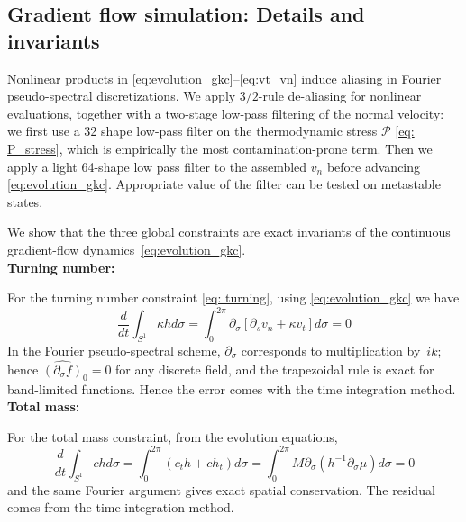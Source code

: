 \documentclass[
aip,
jcp,
reprint, 
floatfix
]{revtex4-1}
\begin{document}
\subsection{Gradient flow simulation: Details and invariants}
Nonlinear products in \eqref{eq:evolution_gkc}--\eqref{eq:vt_vn} induce aliasing in Fourier pseudo-spectral discretizations. We apply $3/2$-rule de-aliasing for nonlinear evaluations, together with a two-stage low-pass filtering of the normal velocity: we first use a 32 shape low-pass filter on the thermodynamic stress $\mathcal P$ \eqref{eq: P_stress}, which is empirically the most contamination-prone term. Then we apply a light 64-shape low pass filter to the assembled $v_n$ before advancing \eqref{eq:evolution_gkc}. Appropriate value of the filter can be tested on metastable states. 

We show that the three global constraints are exact invariants of the continuous gradient-flow dynamics~\eqref{eq:evolution_gkc}.\\

{\bf Turning number:}\label{sec:turning_cons}

For the turning number constraint \eqref{eq: turning}, using \eqref{eq:evolution_gkc} we have  
\begin{equation}
    \frac{d}{d t} \int_{S^1} \kappa h d \sigma=\int_0^{2 \pi} \partial_\sigma[\partial_s v_n+\kappa v_t] d \sigma=0
\end{equation}
In the Fourier pseudo-spectral scheme, $\partial_\sigma$ corresponds to multiplication by~$ik$; hence $\widehat{(\partial_\sigma f)}_0=0$ for any discrete field, and the trapezoidal rule is exact for band-limited functions. Hence the error comes with the time integration method.\\

{\bf Total mass:}\label{sec:mass_cons}

For the total mass constraint, from the evolution equations,
\begin{equation}
    \frac{d}{d t} \int_{S^1} ch d \sigma=\int_0^{2 \pi}\left(c_t h+c h_t\right) d \sigma=\int_0^{2 \pi} M \partial_\sigma\left(h^{-1} \partial_\sigma \mu\right) d \sigma=0
\end{equation}
and the same Fourier argument gives exact spatial conservation. The residual comes from the time integration method.\\
\end{document}
